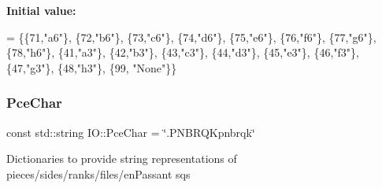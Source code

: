 {\bfseries Initial value\+:}
\begin{DoxyCode}
= 
    \{\{71,\textcolor{stringliteral}{"a6"}\}, \{72,\textcolor{stringliteral}{"b6"}\}, \{73,\textcolor{stringliteral}{"c6"}\}, \{74,\textcolor{stringliteral}{"d6"}\}, \{75,\textcolor{stringliteral}{"e6"}\}, \{76,\textcolor{stringliteral}{"f6"}\}, \{77,\textcolor{stringliteral}{"g6"}\}, \{78,\textcolor{stringliteral}{"h6"}\},
     \{41,\textcolor{stringliteral}{"a3"}\}, \{42,\textcolor{stringliteral}{"b3"}\}, \{43,\textcolor{stringliteral}{"c3"}\}, \{44,\textcolor{stringliteral}{"d3"}\}, \{45,\textcolor{stringliteral}{"e3"}\}, \{46,\textcolor{stringliteral}{"f3"}\}, \{47,\textcolor{stringliteral}{"g3"}\}, \{48,\textcolor{stringliteral}{"h3"}\}, \{99, \textcolor{stringliteral}{"None"}\}\}
\end{DoxyCode}
\mbox{\label{namespaceIO_a1c70218e9ea5ec5ff1a2a3e486dc1c9d}} 
\subsubsection{\texorpdfstring{Pce\+Char}{PceChar}}
{\footnotesize\ttfamily const std\+::string I\+O\+::\+Pce\+Char = \char`\"{}.P\+N\+B\+R\+Q\+Kpnbrqk\char`\"{}}

Dictionaries to provide string representations of pieces/sides/ranks/files/en\+Passant sq\textquotesingle{}s 
